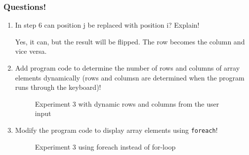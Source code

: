 \documentclass[12pt,titlepage]{article}
\begin{document}
\subsubsection*{Questions!}
\begin{enumerate}
    \item {
        In step 6 can position j be replaced with position i? Explain!

        Yes, it can, but the result will be flipped. The row becomes the column and vice versa.
    }
    \item {
        Add program code to determine the number of rows and columns of array elements dynamically (rows and columsn are determined when the program runs through the keyboard)!

        \begin{figure}[h]
            \centering
            \caption{Experiment 3 with dynamic rows and columns from the user input}
        \end{figure}
    }
    \item {
        Modify the program code to display array elements using \texttt{foreach}!

        \begin{figure}[h]
            \centering
            \caption{Experiment 3 using foreach instead of for-loop}
        \end{figure}
    }
\end{enumerate}
\end{document}

